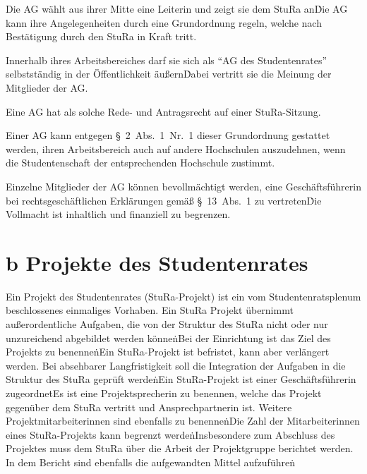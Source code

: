 \begin{multicols}{2}
\Abs \Satz Die AG wählt aus ihrer Mitte eine Leiterin und zeigt sie dem StuRa an\. Die AG kann ihre Angelegenheiten durch eine Grundordnung regeln, welche nach Bestätigung durch den StuRa in Kraft tritt.

\Abs \Satz Innerhalb ihres Arbeitsbereiches darf sie sich als "`AG des Studentenrates"' selbstständig in der Öffentlichkeit äußern\. Dabei vertritt sie die Meinung der Mitglieder der AG.

\Abs \Satz Eine AG hat als solche Rede- und Antragsrecht auf einer StuRa-Sitzung.

\Abs \Satz Einer AG kann entgegen §~2~Abs.~1~Nr.~1 dieser Grundordnung gestattet werden, ihren Arbeitsbereich auch auf andere Hochschulen auszudehnen, wenn die Studentenschaft der entsprechenden Hochschule zustimmt.

\Abs \Satz Einzelne Mitglieder der AG können bevollmächtigt werden, eine Geschäftsführerin bei rechtsgeschäftlichen Erklärungen gemäß §~13~Abs.~1 zu vertreten\. Die Vollmacht ist inhaltlich und finanziell zu begrenzen.

\setcounter{section}{27}
\section{b Projekte des Studentenrates}


\Abs \Satz Ein Projekt des Studentenrates (StuRa-Projekt) ist ein vom Studentenratsplenum beschlossenes einmaliges Vorhaben. Ein StuRa Projekt übernimmt außerordentliche Aufgaben, die von der Struktur des StuRa nicht oder nur unzureichend abgebildet werden können\.

\Abs \Satz Bei der Einrichtung ist das Ziel des Projekts zu benennen\.

\Abs \Satz Ein StuRa-Projekt ist befristet, kann aber verlängert werden. Bei absehbarer Langfristigkeit soll die Integration der Aufgaben in die Struktur des StuRa geprüft werden\.

\Abs \Satz Ein StuRa-Projekt ist einer Geschäftsführerin zugeordnet\.

\Abs \Satz Es ist eine Projektsprecherin zu benennen, welche das Projekt gegenüber dem StuRa vertritt und Ansprechpartnerin ist. Weitere Projektmitarbeiterinnen sind ebenfalls zu benennen\.

\Abs \Satz Die Zahl der Mitarbeiterinnen eines StuRa-Projekts kann begrenzt werden\.

\Abs \Satz Insbesondere zum Abschluss des Projektes muss dem StuRa über die Arbeit der Projektgruppe berichtet werden. In dem Bericht sind ebenfalls die aufgewandten Mittel aufzuführen\.


\end{multicols}
